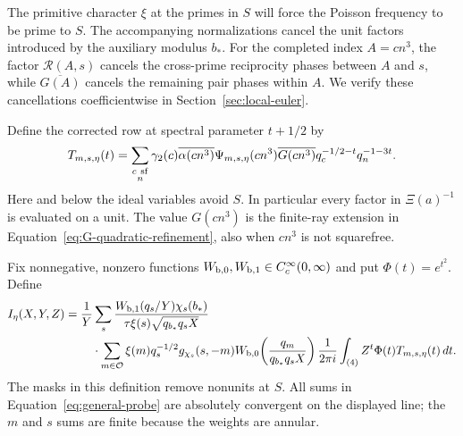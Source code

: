 \documentclass[12pt]{article}
\begin{document}
The primitive character $\xi$ at the primes in $S$ will force the
Poisson frequency to be prime to $S$. The accompanying normalizations
cancel the unit factors introduced by the auxiliary modulus $b_*$.
For the completed index $A=cn^3$, the factor $\mathcal R(A,s)$
cancels the cross-prime reciprocity phases between $A$ and $s$, while
$\overline{G(A)}$ cancels the remaining pair phases within $A$.
We verify these cancellations coefficientwise in
Section~\ref{sec:local-euler}.

Define the corrected row at spectral parameter $t+1/2$ by
\[
 T_{m,s,\eta}(t)=
 \sum_{\substack{c\ {\rm sf}\\n}}
 \gamma_2(c)\overline{\alpha(cn^3)}\Psi_{m,s,\eta}(cn^3)
 \overline{G(cn^3)}q_c^{-1/2-t}q_n^{-1-3t}.
\]
Here and below the ideal variables avoid $S$.  In particular every
factor in $\Xi(a)^{-1}$ is evaluated on a unit.  The value
$G(cn^3)$ is the finite-ray extension in
Equation~\eqref{eq:G-quadratic-refinement}, also when $cn^3$ is not
squarefree.

Fix nonnegative, nonzero functions $W_{\rm b,0},W_{\rm b,1}\in C_c^\infty(0,\infty)$
and put $\Phi(t)=e^{t^2}$.  Define
\begin{equation}\label{eq:general-probe}
\begin{aligned}
 I_\eta(X,Y,Z)={}&\frac1Y\sum_s
 \frac{W_{\rm b,1}(q_s/Y)\chi_s(b_*)}
      {\tau\xi(s)\sqrt{q_{b_*}q_sX}}\\
 &\quad\cdot\sum_{m\in\mathcal O}
       \xi(m)q_s^{-1/2}g_{\chi_s}(s,-m)
       W_{\rm b,0}\!\left(\frac{q_m}{q_{b_*}q_sX}\right)
       \frac1{2\pi i}\int_{(4)}
             Z^t\Phi(t)T_{m,s,\eta}(t)\,dt.
\end{aligned}
\end{equation}
The masks in this definition remove nonunits at $S$.  All sums in
Equation~\eqref{eq:general-probe} are absolutely convergent on the
displayed line; the $m$ and $s$ sums are finite because the weights
are annular.
\end{document}
